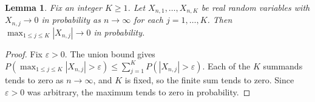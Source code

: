 \documentclass{article}
\newtheorem{lemma}{Lemma}
\begin{document}
\begin{lemma}\label{lem:finite-max}
Fix an integer $K \ge 1$. Let $X_{n,1}, \dots, X_{n,K}$ be real random
variables with $X_{n,j} \to 0$ in probability as $n \to \infty$ for each
$j = 1, \dots, K$. Then $\max_{1 \le j \le K} |X_{n,j}| \to 0$ in
probability.
\end{lemma}

\begin{proof}
Fix $\varepsilon > 0$.
The union bound gives
$P(\max_{1 \le j \le K} |X_{n,j}| > \varepsilon)
\le \sum_{j=1}^{K} P(|X_{n,j}| > \varepsilon)$.
Each of the $K$ summands tends to zero as $n \to \infty$, and $K$ is fixed,
so the finite sum tends to zero.
Since $\varepsilon > 0$ was arbitrary, the maximum tends to zero in
probability.
\end{proof}
\end{document}
